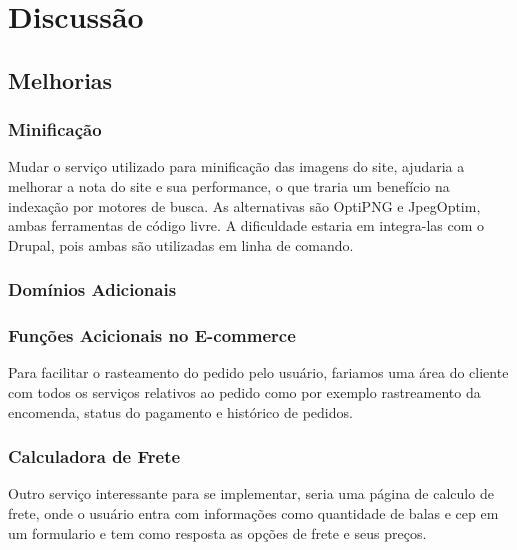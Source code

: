 \chapter{Discussão}



\section{Melhorias}

\subsection{Minificação}
Mudar o serviço utilizado para minificação das imagens do site, ajudaria a melhorar a nota do site e sua performance, o que traria um benefício na indexação por motores de busca. As alternativas são OptiPNG e JpegOptim, ambas ferramentas de código livre. A dificuldade estaria em integra-las com o Drupal, pois ambas são utilizadas em linha de comando.

\subsection{Domínios Adicionais}


\subsection{Funções Acicionais no E-commerce}
Para facilitar o rasteamento do pedido pelo usuário, fariamos uma área do cliente com todos os serviços relativos ao pedido como por exemplo rastreamento da encomenda, status do pagamento e histórico de pedidos.

\subsection{Calculadora de Frete}
Outro serviço interessante para se implementar, seria uma página de calculo de frete, onde o usuário entra com informações como quantidade de balas e cep em um formulario e tem como resposta as opções de frete e seus preços.

